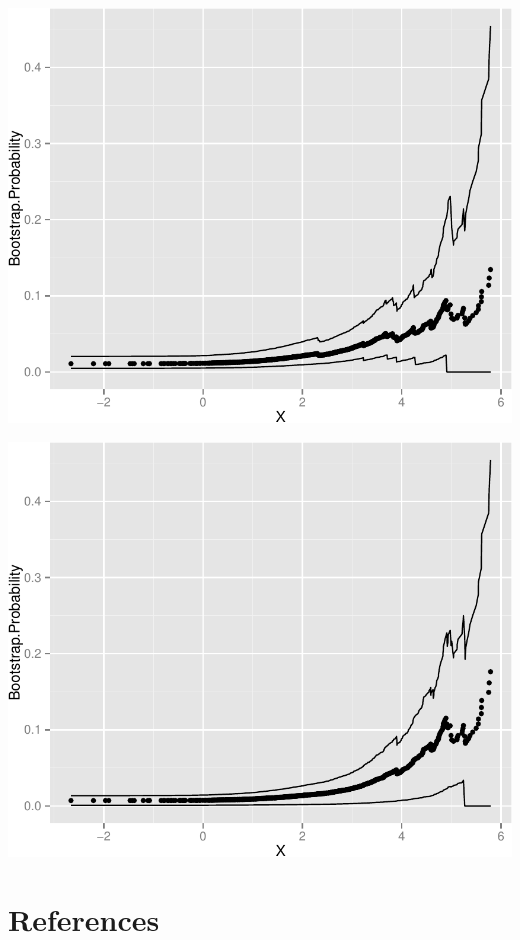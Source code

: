 \documentclass[11pt,]{article}
\begin{document}
\includegraphics{manuscript_files/figure-latex/who_rec_med1_cp-1.pdf}
\newpage

\includegraphics{manuscript_files/figure-latex/who_rec_med2_cp-1.pdf}
\newpage

\section*{References}\label{references}
\end{document}

